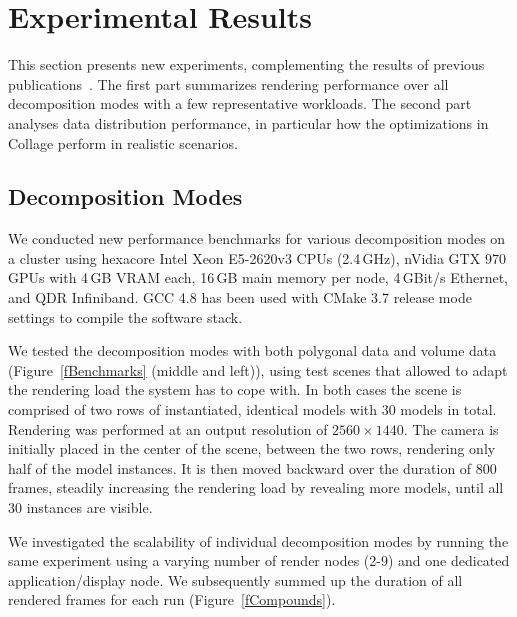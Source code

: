 \documentclass[10pt,journal,compsoc]{IEEEtran}
\newcommand{\fig}[1]{Figure~\ref{#1}}
\begin{document}
\section{Experimental Results}\label{sec:results}

This section presents new experiments, complementing the results of previous
publications~\cite{EP:07, EMP:09, MEP:10, EEP:11, EBAHMP:12, HBBES:13, deflect,
SPEP:16}. The first part summarizes rendering performance over all decomposition
modes with a few representative workloads. The second part analyses data
distribution performance, in particular how the optimizations in
\textsf{Collage} perform in realistic scenarios.

\subsection{Decomposition Modes}


We conducted new performance benchmarks for various decomposition modes on a cluster
using hexacore Intel Xeon E5-2620v3 CPUs (2.4\,GHz), nVidia GTX 970 GPUs with 4\,GB VRAM each, 16\,GB main
memory per node, 4\,GBit/s Ethernet, and QDR Infiniband. GCC 4.8 has been used with CMake
3.7 release mode settings to compile the software stack.

We tested the decomposition modes with both polygonal data and volume data
(\fig{fBenchmarks} (middle and left)), using test scenes that allowed to adapt
the rendering load the system has to cope with. In both cases the scene is
comprised of two rows of instantiated, identical models with 30 models in total.
Rendering was performed at an output resolution of $2560\times1440$. The camera
is initially placed in the center of the scene, between the two rows, rendering
only half of the model instances. It is then moved backward over the duration of
800 frames, steadily increasing the rendering load by revealing more models,
until all 30 instances are visible.

We investigated the scalability of individual decomposition modes by running the
same experiment using a varying number of render nodes (2-9) and one dedicated
application/display node. We subsequently summed up the duration of all rendered
frames for each run (\fig{fCompounds}).
\end{document}
